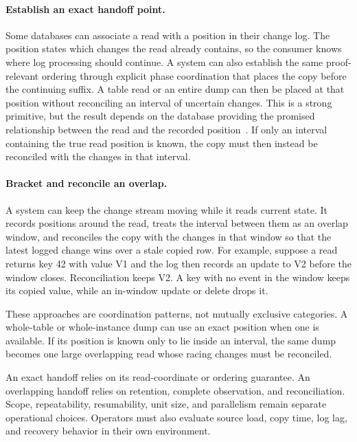 \documentclass[sigconf,nonacm,10pt]{acmart}
\theoremstyle{plain}
\theoremstyle{definition}
\begin{document}
\paragraph{Establish an exact handoff point.}
Some databases can associate a read with a position in
their change log. The position states which changes the read already
contains, so the consumer knows where log processing should continue.
A system can also establish the same proof-relevant ordering through
explicit phase coordination that places the copy before the continuing
suffix.
A table read or an entire dump can then be placed at that position
without reconciling an interval of uncertain changes. This is a
strong primitive, but the result depends on the database providing
the promised relationship between the read and the recorded
position~\cite{mariadb_consistent_snapshot,percona_consistent_snapshot,postgres_protocol_replication,mariadb_binlog_status_vars}.
If only an interval containing the true read position is known, the
copy must then instead be reconciled with the changes in that interval.

\paragraph{Bracket and reconcile an overlap.}
A system can keep the change stream moving while it reads current
state. It records positions around the read, treats the interval between
them as an overlap window, and reconciles the copy with the changes in
that window so that the latest logged change wins over a stale copied
row. For example, suppose a read returns key 42 with value V1 and the log
then records an update to V2 before the window closes. Reconciliation
keeps V2. A key with no event in the window keeps its copied value, while
an in-window update or delete drops it.

These approaches are coordination patterns, not mutually exclusive
categories. A whole-table or whole-instance dump can use an
exact position when one is available. If its position is known only to
lie inside an interval, the same dump becomes one large overlapping
read whose racing changes must be reconciled.

An exact handoff relies on its read-coordinate or ordering guarantee. An
overlapping handoff relies on retention, complete observation, and
reconciliation. Scope, repeatability, resumability, unit size, and
parallelism remain separate operational choices. Operators must also
evaluate source load, copy time, log lag, and recovery behavior in
their own environment.
\end{document}
